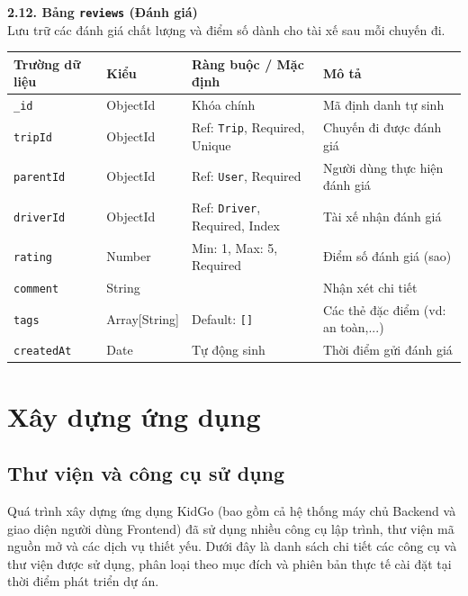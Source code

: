 \documentclass[../DoAn.tex]{subfiles}
\begin{document}
\textbf{2.12. Bảng \texttt{reviews} (Đánh giá)} \\
Lưu trữ các đánh giá chất lượng và điểm số dành cho tài xế sau mỗi chuyến đi.
\begin{table}[H]
    \centering
    \begin{tabular}{|l|l|p{4cm}|p{5cm}|}
        \hline
        \textbf{Trường dữ liệu} & \textbf{Kiểu} & \textbf{Ràng buộc / Mặc định}         & \textbf{Mô tả}                     \\ \hline
        \texttt{\_id}           & ObjectId      & Khóa chính                            & Mã định danh tự sinh               \\ \hline
        \texttt{tripId}         & ObjectId      & Ref: \texttt{Trip}, Required, Unique  & Chuyến đi được đánh giá            \\ \hline
        \texttt{parentId}       & ObjectId      & Ref: \texttt{User}, Required          & Người dùng thực hiện đánh giá      \\ \hline
        \texttt{driverId}       & ObjectId      & Ref: \texttt{Driver}, Required, Index & Tài xế nhận đánh giá               \\ \hline
        \texttt{rating}         & Number        & Min: 1, Max: 5, Required              & Điểm số đánh giá (sao)             \\ \hline
        \texttt{comment}        & String        &                                       & Nhận xét chi tiết                  \\ \hline
        \texttt{tags}           & Array[String] & Default: \texttt{[]}                  & Các thẻ đặc điểm (vd: an toàn,...) \\ \hline
        \texttt{createdAt}      & Date          & Tự động sinh                          & Thời điểm gửi đánh giá             \\ \hline
    \end{tabular}
\end{table}

\newpage
\section{Xây dựng ứng dụng}
\subsection{Thư viện và công cụ sử dụng}
Quá trình xây dựng ứng dụng KidGo (bao gồm cả hệ thống máy chủ Backend và giao diện người dùng Frontend) đã sử dụng nhiều công cụ lập trình, thư viện mã nguồn mở và các dịch vụ thiết yếu. Dưới đây là danh sách chi tiết các công cụ và thư viện được sử dụng, phân loại theo mục đích và phiên bản thực tế cài đặt tại thời điểm phát triển dự án.
\end{document}
